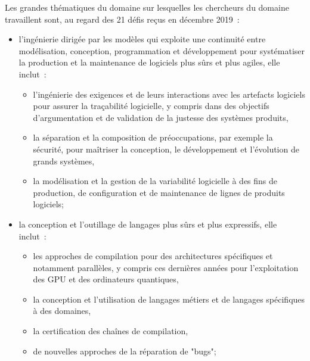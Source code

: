 \documentclass[11pt]{article}
\begin{document}
Les grandes thématiques du domaine sur lesquelles les chercheurs du
domaine travaillent sont, au regard des 21 défis reçus en décembre 2019~: 
\begin{itemize}
  \renewcommand{\labelitemi}{$\bullet$}
\item l'ingénierie dirigée par les modèles qui exploite une continuité entre  modélisation, conception, programmation et développement pour systématiser la production et la maintenance de logiciels plus sûrs et plus agiles, elle inclut~:
\begin{itemize}
\item l'ingénierie des exigences et de leurs interactions avec les artefacts logiciels pour assurer la traçabilité logicielle, y compris dans des objectifs d'argumentation et de validation de la justesse des systèmes produits, 
\item la séparation et la composition de préoccupations, par exemple la sécurité, pour maîtriser la conception, le développement et l'évolution de grands systèmes, 
\item la modélisation et la gestion de la variabilité logicielle à des fins de production, de configuration et de maintenance de lignes de produits logiciels;
\end{itemize}

\item la conception et l'outillage de langages plus sûrs et plus expressifs,  elle inclut~: 
\begin{itemize}
\item les approches de compilation pour des architectures spécifiques et notamment parallèles, y compris ces dernières années pour l'exploitation des GPU et  des ordinateurs quantiques,
\item la conception et l'utilisation de langages métiers et de langages spécifiques à des domaines,
\item la certification des chaînes de compilation,
\item de nouvelles approches de la réparation de "bugs";
\end{itemize}


\end{itemize}
\end{document}
